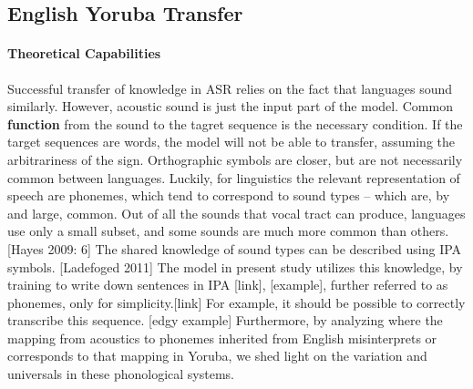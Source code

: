 \documentclass[11pt]{article}
\begin{document}
\subsection{English Yoruba Transfer}
\paragraph{Theoretical Capabilities} Successful transfer of knowledge in ASR relies on the fact that languages sound similarly. However, acoustic sound is just the input part of the model. Common \textbf{function} from the sound to the tagret sequence is the necessary condition. If the target sequences are words, the model will not be able to transfer, assuming the arbitrariness of the sign. Orthographic symbols are closer, but are not necessarily common between languages. Luckily, for linguistics the relevant representation of speech are phonemes, which tend to correspond to sound types -- which are, by and large, common. Out of all the sounds that vocal tract can produce, languages use only a small subset, and some sounds are much more common than others. [Hayes 2009: 6] The shared knowledge of sound types can be described using IPA symbols. [Ladefoged 2011] The model in present study utilizes this knowledge, by training to write down sentences in IPA [link], [example], further referred to as phonemes, only for simplicity.[link] For example, it should be possible to correctly transcribe this sequence. [edgy example] Furthermore, by analyzing where the mapping from acoustics to phonemes inherited from English misinterprets or corresponds to that mapping in Yoruba, we shed light on the variation and universals in these phonological systems.
\end{document}
